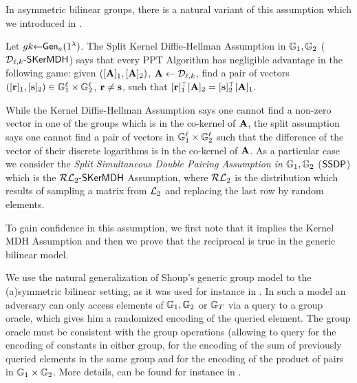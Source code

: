 In asymmetric bilinear groups, there is a natural variant of this assumption which we introduced in \cite{AC:GonHevRaf15}.  
\begin{definition}
Let  ${gk} \hspace*{-3pt} \gets
\hspace*{-3pt}
\mathsf{Gen}_a(1^\lambda)$.
The Split Kernel Diffie-Hellman Assumption in $\mathbb{G}_1,\mathbb{G}_2$  ($\mathcal{D}_{\ell,k}\mbox{-}\mathsf{SKerMDH}$) says that every PPT Algorithm has negligible advantage in the following  game: given $([\mathbf{{A}}]_1,[\mathbf{{A}}]_2)$, $\mathbf{{A}} \leftarrow \mathcal{D}_{\ell,k}$, find a pair of vectors $([\mathbf{r}]_1,[\mathbf{s}]_2) \in \mathbb{G}_1^{\ell} \times \mathbb{G}_2^{\ell}$, $\mathbf{r} \neq \mathbf{s}$, such that 
$[\mathbf{r}]_1^{\top}[\mathbf{{A}}]_2=[\mathbf{s}]_2^{\top}[\mathbf{{A}}]_1$. 
\end{definition}

While the Kernel Diffie-Hellman Assumption says one cannot find a non-zero vector in one of the groups which is in the co-kernel of $\mathbf{{A}}$, the split assumption says one cannot find a pair of vectors in $\mathbb{G}_1^{\ell} \times \mathbb{G}_2^{\ell}$ such that the difference of the vector of their discrete logarithms is in the co-kernel of $\mathbf{{A}}$. 
As a particular case we consider the \emph{Split Simultaneous Double Pairing Assumption in} $\mathbb{G}_1,\mathbb{G}_2$ ($\mathsf{SSDP}$) which is the $\mathcal{RL}_{2}\mbox{-}\mathsf{SKerMDH}$ Assumption, where 
$\mathcal{RL}_{2}$ is the distribution which results of sampling a matrix from $\mathcal{L}_{2}$ and replacing the last row by random elements. 

To gain confidence in this assumption, we first note that it implies the Kernel MDH Assumption and then we prove that the reciprocal is true in the generic bilinear model. 

We use the natural generalization of Shoup's generic group model \cite{EC:Shoup97} to the (a)symmetric bilinear setting, as it was used for instance in \cite{EC:BonBoyGoh05}. In such a model an adversary can only access elements of $\mathbb{G}_1,\mathbb{G}_2$ or $\mathbb{G}_T$ via a query to a group oracle, which gives him a randomized  encoding of the queried element. The group oracle must be consistent with the group operations (allowing to query for the encoding of constants in either group, for the encoding of the sum of previously queried elements in the same group and for the encoding of the product of pairs in $\mathbb{G}_1\times \mathbb{G}_2$. More details, can be found for instance in  \cite{EC:BonBoyGoh05}.




